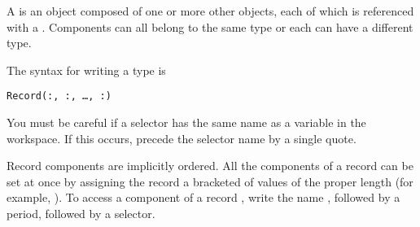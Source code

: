 %
A  is an object composed of one or more other objects,
each of which is referenced
with
a .
Components can all belong to the same type or each can have a different type.

\beginImportant
The syntax for writing a  type is
\begin{center}
{\tt Record(:, :, \ldots, :)}
\end{center}
You must be careful if a selector has the same name as a variable in the
workspace.
If this occurs, precede the selector name by a single
quote.
\endImportant

Record components are implicitly ordered.
All the components of a record can
be set at once by assigning the record a
bracketed  of values of the proper length
(for example, ).
To access a component of a record ,
write the name , followed by a period, followed by a selector.

